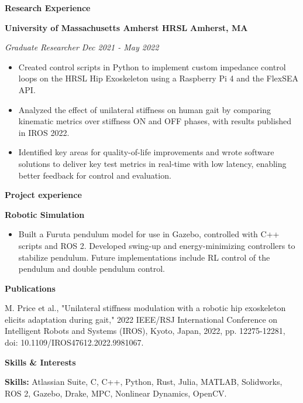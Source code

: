 \documentclass[11pt]{article}
\begin{document}
\textbf{Research Experience}

\textbf{University of Massachusetts Amherst HRSL} \textbf{Amherst, MA}

\emph{Graduate Researcher Dec 2021 - May 2022}

\begin{itemize}
\item
  Created control scripts in Python to implement custom impedance
  control loops on the HRSL Hip Exoskeleton using a Raspberry Pi 4 and
  the FlexSEA API.
\item
  Analyzed the effect of unilateral stiffness on human gait by comparing
  kinematic metrics over stiffness ON and OFF phases, with results
  published in IROS 2022.
\item
  Identified key areas for quality-of-life improvements and wrote
  software solutions to deliver key test metrics in real-time with low
  latency, enabling better feedback for control and evaluation.
\end{itemize}

\textbf{Project experience}

\textbf{Robotic Simulation}

\begin{itemize}
\item
  Built a Furuta pendulum model for use in Gazebo, controlled with C++
  scripts and ROS 2. Developed swing-up and energy-minimizing
  controllers to stabilize pendulum. Future implementations include RL
  control of the pendulum and double pendulum control.
\end{itemize}

\textbf{Publications}

M. Price et al., "Unilateral stiffness modulation with a robotic hip
exoskeleton elicits adaptation during gait," 2022 IEEE/RSJ International
Conference on Intelligent Robots and Systems (IROS), Kyoto, Japan, 2022,
pp. 12275-12281, doi: 10.1109/IROS47612.2022.9981067.

\textbf{Skills \& Interests}

\textbf{Skills:} Atlassian Suite, C, C++, Python, Rust, Julia, MATLAB,
Solidworks, ROS 2, Gazebo, Drake, MPC, Nonlinear Dynamics, OpenCV.
\end{document}
